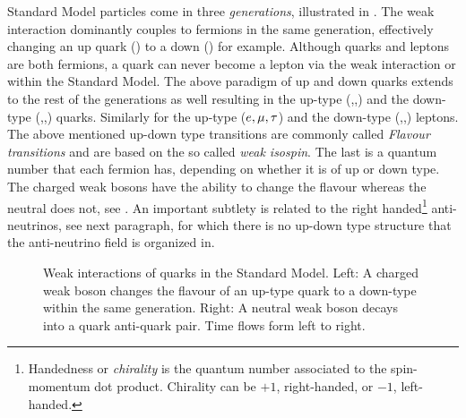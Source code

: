 Standard Model particles come in three {\it generations}, illustrated in .
The weak interaction dominantly couples to fermions in the same generation, effectively changing an up quark (\uquark) to a down (\dquark) for example.
Although quarks and leptons are both fermions, a quark can never become a lepton via the weak interaction or \viceversa within the Standard Model.
The above paradigm of up and down quarks extends to the rest of the generations as well resulting in the up-type (\uquark,\cquark,\tquark)
and the down-type (\dquark,\squark,\bquark) quarks. Similarly for the  up-type ($e,\mu,\tau$) and the down-type (\neue,\neum,\neut)
leptons. The above mentioned up-down type transitions are commonly called {\it Flavour transitions} and are based on the so called
{\it weak isospin}. The last is a quantum number that each fermion has, depending on whether it is of up or down type.
The charged weak bosons \Wpm have the ability to change the flavour whereas the neutral \Z  does not, see .
An important subtlety is related to the right handed\footnote{Handedness or {\it chirality} is the quantum number associated to the
spin-momentum dot product. Chirality can be $+1$, right-handed, or $-1$, left-handed. } anti-neutrinos, see next paragraph,
for which there is no up-down type structure that the anti-neutrino field is organized in.

\begin{figure}[h!]
  \centering
  {\sffamily }
  \caption{Weak interactions of quarks in the Standard Model. Left: A charged weak boson changes the flavour
           of an up-type quark to a down-type within the same generation.
           Right: A neutral weak boson decays into a quark anti-quark pair. Time flows form left to right.}
  \label{WeakInteractions}
\end{figure}

